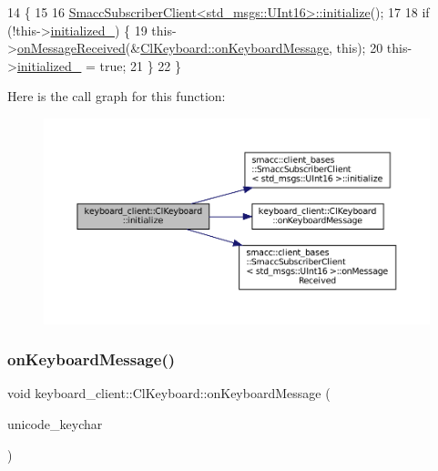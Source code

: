 \begin{DoxyCode}
14                             \{
15 
16   \hyperlink{classsmacc_1_1client__bases_1_1SmaccSubscriberClient_af188f0f5e89de26a07e1f964cdd23a70}{SmaccSubscriberClient<std\_msgs::UInt16>::initialize}();
17 
18   \textcolor{keywordflow}{if} (!this->\hyperlink{classkeyboard__client_1_1ClKeyboard_aff74d4f212f4846a1f7cc6c0e4d5f728}{initialized\_}) \{
19     this->\hyperlink{classsmacc_1_1client__bases_1_1SmaccSubscriberClient_a4f02251e3a161fb6d802b154b1081f18}{onMessageReceived}(&\hyperlink{classkeyboard__client_1_1ClKeyboard_adbfb9c2b98f784b12cf7740b4e861d8e}{ClKeyboard::onKeyboardMessage}, \textcolor{keyword}{
      this});
20     this->\hyperlink{classkeyboard__client_1_1ClKeyboard_aff74d4f212f4846a1f7cc6c0e4d5f728}{initialized\_} = \textcolor{keyword}{true};
21   \}
22 \}
\end{DoxyCode}
Here is the call graph for this function\+:
\nopagebreak
\begin{figure}[H]
\begin{center}
\leavevmode
\includegraphics[width=350pt]{classkeyboard__client_1_1ClKeyboard_a7ac4502969c62b0c836b531cec05f8ed_cgraph}
\end{center}
\end{figure}
\mbox{\label{classkeyboard__client_1_1ClKeyboard_adbfb9c2b98f784b12cf7740b4e861d8e}} 
\subsubsection{\texorpdfstring{on\+Keyboard\+Message()}{onKeyboardMessage()}}
{\footnotesize\ttfamily void keyboard\+\_\+client\+::\+Cl\+Keyboard\+::on\+Keyboard\+Message (\begin{DoxyParamCaption}\item[{const std\+\_\+msgs\+::\+U\+Int16 \&}]{unicode\+\_\+keychar }\end{DoxyParamCaption})}



